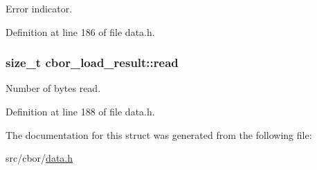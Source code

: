 Error indicator. 



Definition at line 186 of file data.\-h.

\hypertarget{structcbor__load__result_ac5d6290cac5893bd060f6759beef2b28}{
\subsubsection[{read}]{\setlength{\rightskip}{0pt plus 5cm}size\-\_\-t cbor\-\_\-load\-\_\-result\-::read}}\label{structcbor__load__result_ac5d6290cac5893bd060f6759beef2b28}


Number of bytes read. 



Definition at line 188 of file data.\-h.



The documentation for this struct was generated from the following file\-:\begin{DoxyCompactItemize}
\item 
src/cbor/\hyperlink{data_8h}{data.\-h}\end{DoxyCompactItemize}
